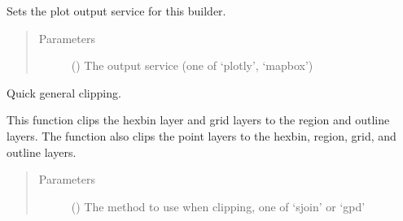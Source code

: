 \documentclass[letterpaper,10pt,english]{sphinxmanual}
\begin{document}
\begin{fulllineitems}
\begin{fulllineitems}
\end{fulllineitems}


\begin{fulllineitems}
\label{\detokenize{builder:geohexviz.builder.PlotBuilder.set_plot_output_service}}
\sphinxAtStartPar
Sets the plot output service for this builder.
\begin{quote}\begin{description}
\item[{Parameters}] \leavevmode
\sphinxAtStartPar
{} () \textendash{} The output service (one of ‘plotly’, ‘mapbox’)

\end{description}\end{quote}

\end{fulllineitems}


\begin{fulllineitems}
\label{\detokenize{builder:geohexviz.builder.PlotBuilder.simple_clip}}
\sphinxAtStartPar
Quick general clipping.

\sphinxAtStartPar
This function clips the hexbin layer and grid layers to the region and outline layers.
The function also clips the point layers to the hexbin, region, grid, and outline layers.
\begin{quote}\begin{description}
\item[{Parameters}] \leavevmode
\sphinxAtStartPar
{} () \textendash{} The method to use when clipping, one of ‘sjoin’ or ‘gpd’

\end{description}\end{quote}


\end{fulllineitems}
\end{fulllineitems}
\end{document}
